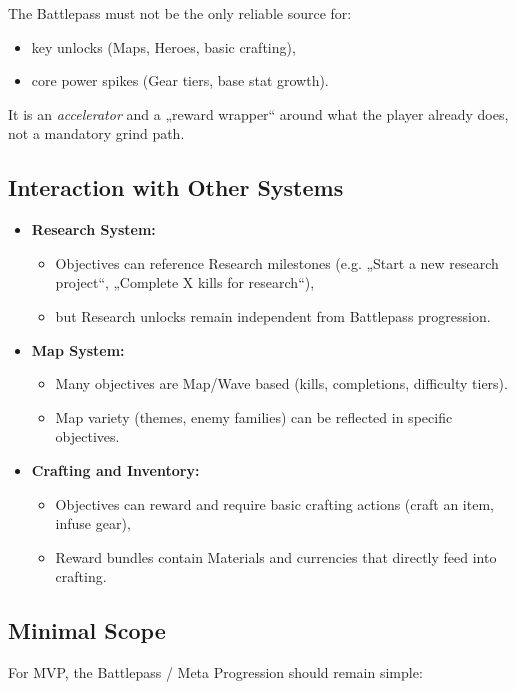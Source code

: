 The Battlepass must not be the only reliable source for:
\begin{itemize}
	\item key unlocks (Maps, Heroes, basic crafting),
	\item core power spikes (Gear tiers, base stat growth).
\end{itemize}

It is an \emph{accelerator} and a „reward wrapper“ around what the player already does, not a mandatory grind path.

\subsection{Interaction with Other Systems}

\begin{itemize}
	\item \textbf{Research System:}
	\begin{itemize}
		\item Objectives can reference Research milestones (e.g. „Start a new research project“, „Complete X kills for research“),
		\item but Research unlocks remain independent from Battlepass progression.
	\end{itemize}
	\item \textbf{Map System:}
	\begin{itemize}
		\item Many objectives are Map/Wave based (kills, completions, difficulty tiers).
		\item Map variety (themes, enemy families) can be reflected in specific objectives.
	\end{itemize}
	\item \textbf{Crafting and Inventory:}
	\begin{itemize}
		\item Objectives can reward and require basic crafting actions (craft an item, infuse gear),
		\item Reward bundles contain Materials and currencies that directly feed into crafting.
	\end{itemize}
\end{itemize}

\subsection{Minimal Scope}

For MVP, the Battlepass / Meta Progression should remain simple:

